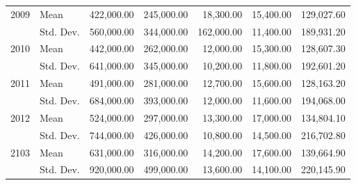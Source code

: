 \documentclass[11pt,a4paper,oneside]{article}
\begin{document}
\begin{table}[htbp]
{\begin{threeparttable}
\begin{tabular}{clrrrrr}
    \midrule
    \multicolumn{1}{l}{2009} & Mean  & 422,000.00 & 245,000.00 & 18,300.00 & 15,400.00 & 129,027.60 \\
          & Std. Dev. & 560,000.00 & 344,000.00 & 162,000.00 & 11,400.00 & 189,931.20 \\
    \midrule
    \multicolumn{1}{l}{2010} & Mean  & 442,000.00 & 262,000.00 & 12,000.00 & 15,300.00 & 128,607.30 \\
          & Std. Dev. & 641,000.00 & 345,000.00 & 10,200.00 & 11,800.00 & 192,601.20 \\
    \midrule
    \multicolumn{1}{l}{2011} & Mean  & 491,000.00 & 281,000.00 & 12,700.00 & 15,600.00 & 128,163.20 \\
          & Std. Dev. & 684,000.00 & 393,000.00 & 12,000.00 & 11,600.00 & 194,068.00 \\
    \midrule
    \multicolumn{1}{l}{2012} & Mean  & 524,000.00 & 297,000.00 & 13,300.00 & 17,000.00 & 134,804.10 \\
          & Std. Dev. & 744,000.00 & 426,000.00 & 10,800.00 & 14,500.00 & 216,702.80 \\
    \midrule
    \multicolumn{1}{l}{2103} & Mean  & 631,000.00 & 316,000.00 & 14,200.00 & 17,600.00 & 139,664.90 \\
          & Std. Dev. & 920,000.00 & 499,000.00 & 13,600.00 & 14,100.00 & 220,145.90 \\

\end{tabular}
\end{threeparttable}}
\end{table}
\end{document}
